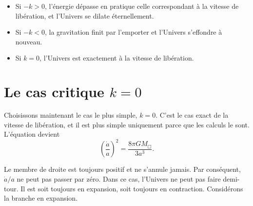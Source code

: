 \begin{itemize}
\item Si \(-k>0\), l’énergie dépasse en pratique celle correspondant à la vitesse de libération, et l’Univers se dilate éternellement.
\item Si \(-k<0\), la gravitation finit par l’emporter et l’Univers s’effondre à nouveau.
\item Si \(k=0\), l’Univers est exactement à la vitesse de libération.
\end{itemize}

\begin{classroomqa}
\end{classroomqa}

\section{Le cas critique \(k=0\)}

Choisissons maintenant le cas le plus simple, \(k=0\). C’est le cas exact de la vitesse de libération, et il est plus simple uniquement parce que les calculs le sont. L’équation devient
\begin{equation}
\left(\frac{\dot a}{a}\right)^2=\frac{8\pi G M_{\Box}}{3a^3}.
\end{equation}

Le membre de droite est toujours positif et ne s’annule jamais. Par conséquent, \(\dot a/a\) ne peut pas passer par zéro. Dans ce cas, l’Univers ne peut pas faire demi-tour. Il est soit toujours en expansion, soit toujours en contraction. Considérons la branche en expansion.

